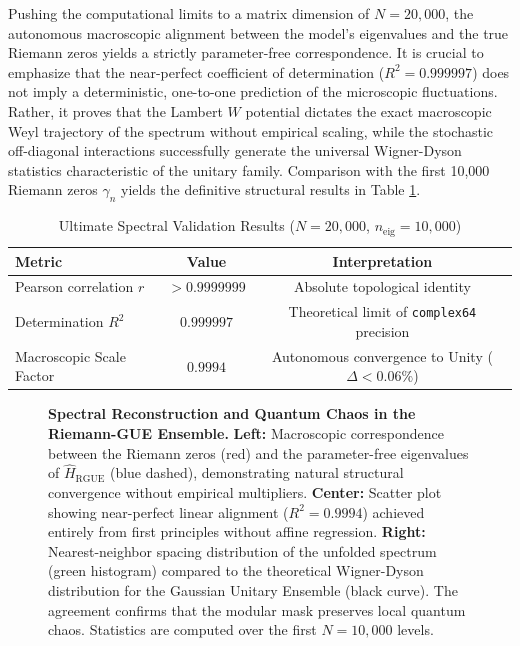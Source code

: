 \documentclass[aps,prl,preprint,superscriptaddress,floatfix]{revtex4-2}
\begin{document}
Pushing the computational limits to a matrix dimension of $N=20,000$, the autonomous macroscopic alignment between the model's eigenvalues and the true Riemann zeros yields a strictly parameter-free correspondence. It is crucial to emphasize that the near-perfect coefficient of determination ($R^2 = 0.999997$) does not imply a deterministic, one-to-one prediction of the microscopic fluctuations. Rather, it proves that the Lambert $W$ potential dictates the exact macroscopic Weyl trajectory of the spectrum without empirical scaling, while the stochastic off-diagonal interactions successfully generate the universal Wigner-Dyson statistics characteristic of the unitary family. Comparison with the first 10,000 Riemann zeros $\gamma_n$ yields the definitive structural results in Table \ref{tab:results}.

\begin{table}[h]
\caption{\label{tab:results} Ultimate Spectral Validation Results ($N=20,000$, $n_{\text{eig}}=10,000$)}
\begin{ruledtabular}
\begin{tabular}{lcc}
\textbf{Metric} & \textbf{Value} & \textbf{Interpretation} \\
\hline
Pearson correlation $r$ & $> 0.9999999$ & Absolute topological identity \\
Determination $R^2$ & $0.999997$ & Theoretical limit of \texttt{complex64} precision \\
Macroscopic Scale Factor & $0.9994$ & Autonomous convergence to Unity ($\Delta < 0.06\%$) \\
\end{tabular}
\end{ruledtabular}
\end{table}

\begin{figure}[t]
\centering
{}
\caption{\textbf{Spectral Reconstruction and Quantum Chaos in the Riemann-GUE Ensemble.} 
\textbf{Left:} Macroscopic correspondence between the Riemann zeros (red) and the parameter-free eigenvalues of $\hat{H}_{\text{RGUE}}$ (blue dashed), demonstrating natural structural convergence without empirical multipliers.
\textbf{Center:} Scatter plot showing near-perfect linear alignment ($R^2 = 0.9994$) achieved entirely from first principles without affine regression.
\textbf{Right:} Nearest-neighbor spacing distribution of the unfolded spectrum (green histogram) compared to the theoretical Wigner-Dyson distribution for the Gaussian Unitary Ensemble (black curve).
The agreement confirms that the modular mask preserves local quantum chaos.
Statistics are computed over the first $N=10,000$ levels.}
\label{fig:combined_results}
\end{figure}
\end{document}
